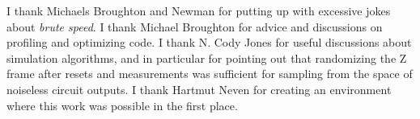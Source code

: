 \documentclass[onecolumn,unpublished]{quantumarticle}
\theoremstyle{definition}
\theoremstyle{definition}
\theoremstyle{definition}
\begin{document}
I thank Michaels Broughton and Newman for putting up with excessive jokes about {\em brute speed}.
I thank Michael Broughton for advice and discussions on profiling and optimizing code.
I thank N. Cody Jones for useful discussions about simulation algorithms, and in particular for pointing out that randomizing the Z frame after resets and measurements was sufficient for sampling from the space of noiseless circuit outputs.
I thank Hartmut Neven for creating an environment where this work was possible in the first place.




\end{document}
